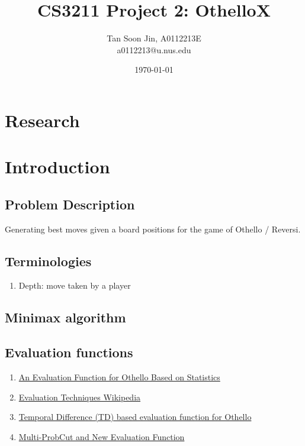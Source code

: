 \documentclass[12pt]{article}
\title{CS3211 Project 2: OthelloX}
\author{Tan Soon Jin, A0112213E \\ a0112213@u.nus.edu}
\date{\today}
\begin{document}
\maketitle


\section{Research}



\section{Introduction}

\subsection{Problem Description}

Generating best moves given a board positions for the game of Othello / Reversi.

\subsection{Terminologies}

\begin{enumerate}
  \item Depth: move taken by a player
\end{enumerate}

\subsection{Minimax algorithm}

\subsection{Evaluation functions}

\begin{enumerate}
  \item \href{https://skatgame.net/mburo/ps/evalfunc.pdf}{An Evaluation Function for
  Othello Based on Statistics}
  \item
    \href{https://en.wikipedia.org/wiki/Computer_Othello#Evaluation_techniques}{Evaluation
    Techniques Wikipedia}
  \item
    \href{http://www.csse.uwa.edu.au/cig08/Proceedings/papers/8010.pdf}{Temporal
    Difference (TD) based evaluation function for Othello}
  \item \href{https://skatgame.net/mburo/ps/improve.pdf}{Multi-ProbCut and New
      Evaluation Function}
\end{enumerate}
\end{document}
